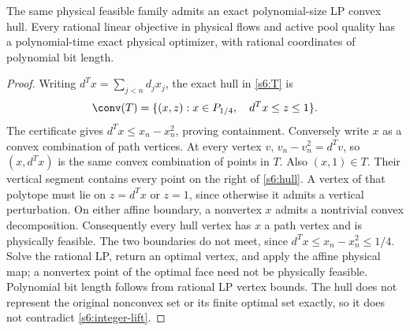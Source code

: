 \begin{theorem}\label{s6:lp-hull}
The same physical feasible family admits an exact polynomial-size LP
convex hull. Every rational linear objective in physical flows and active
pool quality has a polynomial-time exact physical optimizer, with rational
coordinates of polynomial bit length.
\end{theorem}
\begin{proof}
Writing $d^Tx=\sum_{j<n}d_jx_j$, the exact hull in \eqref{s6:T} is
\begin{equation}
 \conv(T)=\{(x,z):x\in P_{1/4},\quad d^Tx\le z\le1\}.
 \label{s6:hull}
\end{equation}
The certificate gives $d^Tx\le x_n-x_n^2$, proving containment.
Conversely write $x$ as a convex combination of path vertices.
At every vertex $v$, $v_n-v_n^2=d^Tv$, so $(x,d^Tx)$ is the same
convex combination of points in $T$. Also $(x,1)\in T$. Their vertical
segment contains every point on the right of \eqref{s6:hull}.
A vertex of that polytope must lie on $z=d^Tx$ or $z=1$, since otherwise
it admits a vertical perturbation. On either affine boundary, a nonvertex
$x$ admits a nontrivial convex decomposition. Consequently every hull
vertex has $x$ a path vertex and is physically feasible. The two
boundaries do not meet, since $d^Tx\le x_n-x_n^2\le1/4$.
Solve the rational LP, return an optimal vertex, and apply the affine
physical map; a nonvertex point of the optimal face need not
be physically feasible. Polynomial bit length follows from rational LP
vertex bounds. The hull does not represent the original
nonconvex set or its finite optimal set exactly, so it does not contradict
\cref{s6:integer-lift}.
\end{proof}


